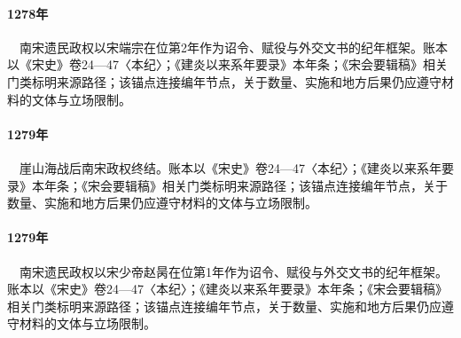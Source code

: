 \paragraph{1278年}　南宋遗民政权以宋端宗在位第2年作为诏令、赋役与外交文书的纪年框架。账本以《宋史》卷24—47〈本纪〉；《建炎以来系年要录》本年条；《宋会要辑稿》相关门类标明来源路径；该锚点连接编年节点，关于数量、实施和地方后果仍应遵守材料的文体与立场限制。

\paragraph{1279年}　崖山海战后南宋政权终结。账本以《宋史》卷24—47〈本纪〉；《建炎以来系年要录》本年条；《宋会要辑稿》相关门类标明来源路径；该锚点连接编年节点，关于数量、实施和地方后果仍应遵守材料的文体与立场限制。

\paragraph{1279年}　南宋遗民政权以宋少帝赵昺在位第1年作为诏令、赋役与外交文书的纪年框架。账本以《宋史》卷24—47〈本纪〉；《建炎以来系年要录》本年条；《宋会要辑稿》相关门类标明来源路径；该锚点连接编年节点，关于数量、实施和地方后果仍应遵守材料的文体与立场限制。
